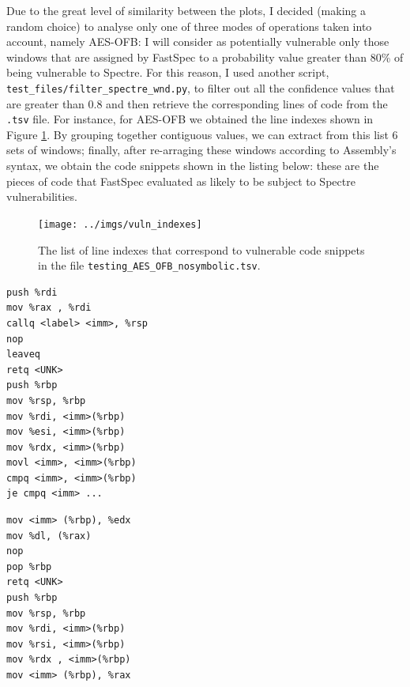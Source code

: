 \documentclass[12pt,a4paper]{book}
\theoremstyle{definition}
\begin{document}
	Due to the great level of similarity between the plots, I decided (making a random choice) to analyse only one of three modes of operations taken into account, namely AES-OFB: I will consider as potentially vulnerable only those windows that are assigned by FastSpec to a probability value greater than 80\% of being vulnerable to Spectre. For this reason, I used another script, \texttt{test\_files/filter\_spectre\_wnd.py}, to filter out all the confidence values that are greater than 0.8 and then retrieve the corresponding lines of code from the \texttt{.tsv} file. For instance, for AES-OFB we obtained the line indexes shown in Figure \ref{fig:idx}. By grouping together contiguous values, we can extract from this list 6 sets of windows; finally, after re-arraging these windows according to Assembly's 
	syntax, we obtain the code snippets shown in the listing below: these are the pieces of code that FastSpec evaluated as likely to be subject to Spectre vulnerabilities.
	
	\begin{figure}[!ht]
		\centering
		\texttt{[image: ../imgs/vuln\_indexes]}
		\caption{The list of line indexes that correspond to vulnerable code snippets in the file \texttt{testing\_AES\_OFB\_nosymbolic.tsv}.}
		\label{fig:idx}
	\end{figure}

	\begin{minipage}{.45\textwidth}
		\begin{lstlisting}[caption={Window 369-379}]
push %rdi
mov %rax , %rdi
callq <label> <imm>, %rsp
nop
leaveq
retq <UNK>
push %rbp
mov %rsp, %rbp
mov %rdi, <imm>(%rbp)
mov %esi, <imm>(%rbp)
mov %rdx, <imm>(%rbp)
movl <imm>, <imm>(%rbp)
cmpq <imm>, <imm>(%rbp)
je cmpq <imm> ...
		\end{lstlisting}
	\end{minipage}\hfill
	\begin{minipage}{.45\textwidth}
		\begin{lstlisting}[caption={Window 7992-7997}]
mov <imm> (%rbp), %edx
mov %dl, (%rax)
nop
pop %rbp
retq <UNK>
push %rbp
mov %rsp, %rbp
mov %rdi, <imm>(%rbp)
mov %rsi, <imm>(%rbp)
mov %rdx , <imm>(%rbp)
mov <imm> (%rbp), %rax
		\end{lstlisting}
	\end{minipage}
\end{document}
